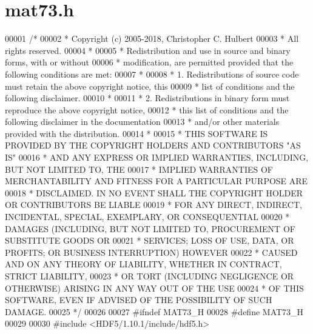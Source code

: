 \hypertarget{mat73_8h_source}{}\section{mat73.\+h}
\label{mat73_8h_source}

\begin{DoxyCode}
00001 \textcolor{comment}{/*}
00002 \textcolor{comment}{ * Copyright (c) 2005-2018, Christopher C. Hulbert}
00003 \textcolor{comment}{ * All rights reserved.}
00004 \textcolor{comment}{ *}
00005 \textcolor{comment}{ * Redistribution and use in source and binary forms, with or without}
00006 \textcolor{comment}{ * modification, are permitted provided that the following conditions are met:}
00007 \textcolor{comment}{ *}
00008 \textcolor{comment}{ * 1. Redistributions of source code must retain the above copyright notice, this}
00009 \textcolor{comment}{ *    list of conditions and the following disclaimer.}
00010 \textcolor{comment}{ *}
00011 \textcolor{comment}{ * 2. Redistributions in binary form must reproduce the above copyright notice,}
00012 \textcolor{comment}{ *    this list of conditions and the following disclaimer in the documentation}
00013 \textcolor{comment}{ *    and/or other materials provided with the distribution.}
00014 \textcolor{comment}{ *}
00015 \textcolor{comment}{ * THIS SOFTWARE IS PROVIDED BY THE COPYRIGHT HOLDERS AND CONTRIBUTORS "AS IS"}
00016 \textcolor{comment}{ * AND ANY EXPRESS OR IMPLIED WARRANTIES, INCLUDING, BUT NOT LIMITED TO, THE}
00017 \textcolor{comment}{ * IMPLIED WARRANTIES OF MERCHANTABILITY AND FITNESS FOR A PARTICULAR PURPOSE ARE}
00018 \textcolor{comment}{ * DISCLAIMED. IN NO EVENT SHALL THE COPYRIGHT HOLDER OR CONTRIBUTORS BE LIABLE}
00019 \textcolor{comment}{ * FOR ANY DIRECT, INDIRECT, INCIDENTAL, SPECIAL, EXEMPLARY, OR CONSEQUENTIAL}
00020 \textcolor{comment}{ * DAMAGES (INCLUDING, BUT NOT LIMITED TO, PROCUREMENT OF SUBSTITUTE GOODS OR}
00021 \textcolor{comment}{ * SERVICES; LOSS OF USE, DATA, OR PROFITS; OR BUSINESS INTERRUPTION) HOWEVER}
00022 \textcolor{comment}{ * CAUSED AND ON ANY THEORY OF LIABILITY, WHETHER IN CONTRACT, STRICT LIABILITY,}
00023 \textcolor{comment}{ * OR TORT (INCLUDING NEGLIGENCE OR OTHERWISE) ARISING IN ANY WAY OUT OF THE USE}
00024 \textcolor{comment}{ * OF THIS SOFTWARE, EVEN IF ADVISED OF THE POSSIBILITY OF SUCH DAMAGE.}
00025 \textcolor{comment}{ */}
00026 
00027 \textcolor{preprocessor}{#ifndef MAT73\_H}
00028 \textcolor{preprocessor}{#define MAT73\_H}
00029 
00030 \textcolor{preprocessor}{#include <HDF5/1.10.1/include/hdf5.h>}

\end{DoxyCode}
